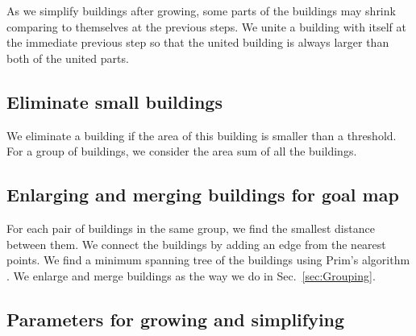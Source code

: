 \documentclass[graybox]{svmult}
\newcommand{\sect}{Sec.~}
\begin{document}
As we simplify buildings after growing, 
some parts of the buildings may shrink 
comparing to themselves at the previous steps.
We unite a building with itself at the immediate previous step so that the 
united building is always larger than both of the united parts.


\subsection{Eliminate small buildings}
\label{sec:Eliminate}
We eliminate a building if the area of this building is smaller than a 
threshold.
For a group of buildings, we consider the area sum of all the buildings.





\subsection{Enlarging and merging buildings for goal map}
For each pair of buildings in the same group, 
we find the smallest distance between them.
We connect the buildings by adding an edge from the nearest points.
We find a minimum spanning tree of the buildings using Prim's algorithm 
\parencite{Prim1957}.
We enlarge and merge buildings as the way we do in \sect\ref{sec:Grouping}.






\subsection{Parameters for growing and simplifying}
\end{document}

